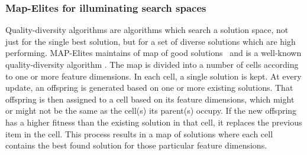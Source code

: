 
\subsubsection{Map-Elites for illuminating search spaces}

Quality-diversity algorithms are algorithms which search a %
solution space, not just for the single best solution, but for a set of diverse solutions which are high performing. MAP-Elites maintains of map of good solutions~ and is a well-known quality-diversity algorithm%
. The map is divided into a number of cells according to one or more feature dimensions. In each cell, a single solution is kept. At every update, an offspring is generated based on one or more existing solutions. That offspring     is then assigned to a cell based on its feature dimensions, which might or might not be the same as the cell(s) its parent(s) occupy. %
If the new offspring has a higher fitness than the existing solution in that cell, it replaces the previous item in the cell. This process results in a map of solutions where each cell contains the best found solution for those particular feature dimensions.

